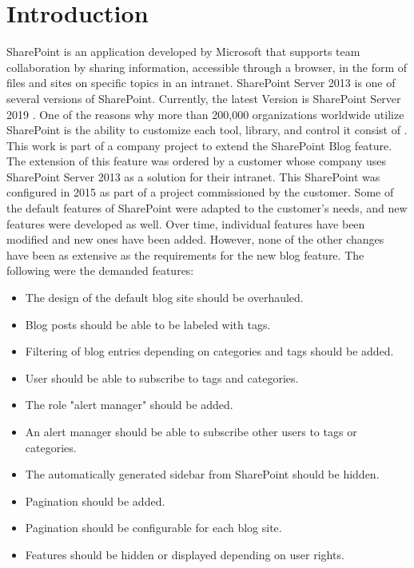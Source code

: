 \documentclass[Bachelor,BIF,english]{twbook}
\begin{document}
\chapter{Introduction}
SharePoint \cite{SharePoint} is an application developed by Microsoft that supports team collaboration by sharing information, accessible through a browser, in the form of files and sites on specific topics in an intranet. SharePoint Server 2013 is one of several versions of SharePoint. Currently, the latest Version is SharePoint Server 2019 \cite{SharePoint}. One of the reasons why more than 200,000 organizations worldwide utilize SharePoint is the ability to customize each tool, library, and control it consist of \cite{SharePoint} \cite{SharePointDevRef}.
\\[\baselineskip]
This work is part of a company project to extend the SharePoint Blog feature. The extension of this feature was ordered by a customer whose company uses SharePoint Server 2013 as a solution for their intranet. This SharePoint was configured in 2015 as part of a project commissioned by the customer. Some of the default features of SharePoint were adapted to the customer's needs, and new features were developed as well. Over time, individual features have been modified and new ones have been added. However, none of the other changes have been as extensive as the requirements for the new blog feature. The following were the demanded features: 
\begin{itemize}
\item The design of the default blog site should be overhauled.
\item Blog posts should be able to be labeled with tags. 
\item Filtering of blog entries depending on categories and tags should be added.
\item User should be able to subscribe to tags and categories. 
\item The role "alert manager" should be added.
\item An alert manager should be able to subscribe other users to tags or categories.
\item The automatically generated sidebar from SharePoint should be hidden. 
\item Pagination should be added.
\item Pagination should be configurable for each blog site.
\item Features should be hidden or displayed depending on user rights.
\end{itemize}
\end{document}
